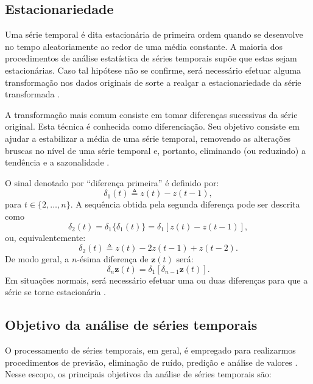  \subsection{Estacionariedade}
 
 Uma série temporal é dita estacionária de primeira ordem quando se desenvolve no tempo aleatoriamente ao redor de uma média constante. A maioria dos procedimentos de análise estatística de séries temporais supõe que estas sejam estacionárias. Caso tal hipótese não se confirme, será necessário efetuar alguma transformação nos dados originais de sorte a realçar a estacionariedade da série transformada \cite{grenander1957statistical}.

 A transformação mais comum consiste em tomar diferenças sucessivas da série original. Esta técnica é conhecida como diferenciação. Seu objetivo consiste em ajudar a estabilizar a média de uma série temporal, removendo as alterações bruscas no nível de uma série temporal e, portanto, eliminando (ou reduzindo) a tendência e a sazonalidade \cite{morettin2006analise, hyndman2018forecasting}.
 
O sinal denotado por ``diferença primeira'' é definido por:
\begin{equation} 
\delta_1(t) \triangleq z(t) - z(t - 1),
\end{equation}
para $t \in \{2,\ldots,n\}$. A sequência obtida pela segunda diferença pode ser descrita como
\begin{equation}
\delta_2(t) = \delta_1\{\delta_1(t)\} = \delta_1[z(t) - z(t - 1)],
\end{equation}
ou, equivalentemente:
\begin{equation}
\delta_2(t) \triangleq z(t) - 2z(t - 1) + z(t - 2).
\end{equation}
De modo geral, a $n$-ésima diferença de $\boldsymbol{z}(t)$ será:
\begin{equation}
\delta_n\boldsymbol{z}(t) = \delta_1[\delta_{n-1}\boldsymbol{z}(t)].
\end{equation}
Em situações normais, será necessário efetuar uma ou duas diferenças para que a série se torne estacionária \cite{morettin2006analise}.

\subsection{Objetivo da análise de séries temporais}

O processamento de séries temporais, em geral, é empregado para realizarmos procedimentos de previsão, eliminação de ruído, predição e análise de valores \cite{morettin2006analise, hyndman2018forecasting}. Nesse escopo, os principais objetivos da análise de séries temporais são:

